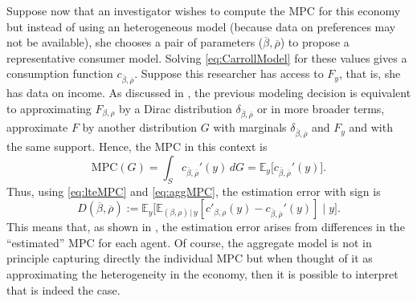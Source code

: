 \documentclass[english, a4paper,12pt]{article}
\begin{document}
Suppose now that an investigator wishes to compute the MPC for this economy but instead of using an heterogeneous model (because data on preferences may not be available), she chooses a pair of parameters ($\overline{\beta}, \overline{\rho}$) to propose a representative consumer model. Solving \eqref{eq:CarrollModel} for these values gives a consumption function $c_{\overline{\beta}, \overline{\rho}}$. Suppose this researcher has access to $F_{y}$, that is, she has data on income. As discussed in , the previous modeling decision is equivalent to approximating $F_{\beta,\rho}$ by a Dirac distribution $\delta_{\overline{\beta},\overline{\rho}}$ or in more broader terms, approximate $F$ by another distribution $G$ with marginals $\delta_{\overline{\beta},\overline{\rho}}$ and $F_{y}$ and with the same support. Hence, the MPC in this context is
	\begin{equation} \label{eq:aggMPC}
		\mathrm{MPC}(G) 
			= \int_{S} c_{\overline{\beta},\overline{\rho}}'(y) \, dG 
			= \mathbb{E}_{y}\Big[ c_{\overline{\beta},\overline{\rho}}'(y) \Big].
	\end{equation}	
Thus, using \eqref{eq:lteMPC} and \eqref{eq:aggMPC}, the estimation error with sign is
	$$D(\overline{\beta}, \overline{\rho})
		:=	\mathbb{E}_{y}\Big[ \mathbb{E}_{(\beta,\rho) \, | \, y}[c'_{\beta,\rho}(y) -  c_{\overline{\beta},\overline{\rho}}'(y) ] \; \Big| \; y \Big].$$
This means that, as shown in , the estimation error arises from differences in the ``estimated'' MPC for each agent. Of course, the aggregate model is not in principle capturing directly the individual MPC but when thought of it as approximating the heterogeneity in the economy, then it is possible to interpret that is indeed the case.


\end{document}

